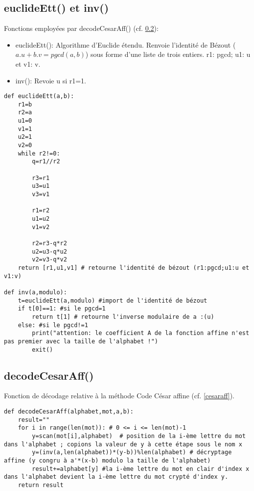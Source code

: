 \documentclass[10pt,a4paper,french]{article}
\begin{document}
\subsection{euclideEtt() et inv()}
Fonctions employées par decodeCesarAff() (cf. \ref{cesaraffc}):
\begin{itemize}
\item euclideEtt(): Algorithme d'Euclide étendu. Renvoie l'identité de Bézout ($a.u+b.v=pgcd(a,b)$) sous forme d'une liste de trois entiers. r1: pgcd; u1: u et v1: v.
\item inv(): Revoie u si r1=1.
\end{itemize}
\begin{lstlisting}
def euclideEtt(a,b):
    r1=b
    r2=a
    u1=0
    v1=1
    u2=1
    v2=0
    while r2!=0:
        q=r1//r2
        
        r3=r1
        u3=u1
        v3=v1

        r1=r2
        u1=u2
        v1=v2

        r2=r3-q*r2
        u2=u3-q*u2
        v2=v3-q*v2
    return [r1,u1,v1] # retourne l'identité de bézout (r1:pgcd;u1:u et v1:v)

def inv(a,modulo):
    t=euclideEtt(a,modulo) #import de l'identité de bézout
    if t[0]==1: #si le pgcd=1
        return t[1] # retourne l'inverse modulaire de a :(u)
    else: #si le pgcd!=1
        print("attention: le coefficient A de la fonction affine n'est pas premier avec la taille de l'alphabet !")
        exit()
\end{lstlisting}
\newpage
\subsection{decodeCesarAff()}\label{cesaraffc}
Fonction de décodage relative à la méthode Code César affine (cf. \ref{cesaraff}).
\begin{lstlisting}
def decodeCesarAff(alphabet,mot,a,b):
    result=""
    for i in range(len(mot)): # 0 <= i <= len(mot)-1
        y=scan(mot[i],alphabet)  # position de la i-ème lettre du mot dans l'alphabet ; copions la valeur de y à cette étape sous le nom x
        y=(inv(a,len(alphabet))*(y-b))%len(alphabet) # décryptage affine (y congru à a'*(x-b) modulo la taille de l'alphabet)
        result+=alphabet[y] #la i-ème lettre du mot en clair d'index x dans l'alphabet devient la i-ème lettre du mot crypté d'index y.
    return result
\end{lstlisting}
\end{document}
